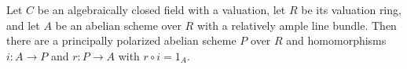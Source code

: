 \begin{theorem}\label{lit-zarhin}
Let $C$ be an algebraically closed field with a valuation, let $R$ be its
valuation ring, and let $A$ be an abelian scheme over $R$ with a relatively
ample line bundle. Then there are a principally polarized abelian scheme $P$
over $R$ and homomorphisms $i:A\to P$ and $r:P\to A$ with $r\circ i=1_A$.
\end{theorem}
